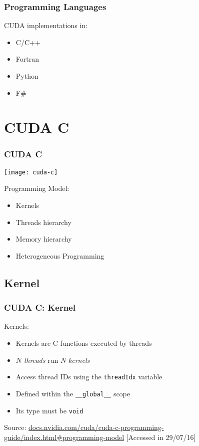 \documentclass[10pt, compress]{beamer}
\begin{document}
\begin{frame}
    \frametitle{Programming Languages}
    CUDA implementations in:
    \begin{itemize}
        \item \alert{C/C++}
        \item Fortran
        \item Python
        \item F\#
    \end{itemize}
\end{frame}

\section{CUDA C}

\begin{frame}
    \frametitle{CUDA C}
    \begin{center}
        \texttt{[image: cuda-c]}
    \end{center}

    \pause
    Programming Model:
    \pause
    \begin{itemize}
        \item \alert{Kernels}
            \pause
        \item \alert{Threads} hierarchy
            \pause
        \item \alert{Memory} hierarchy
            \pause
        \item \alert{Heterogeneous} Programming
    \end{itemize}
\end{frame}

\subsection{Kernel}

\begin{frame}
    \frametitle{CUDA C: Kernel}
    \alert{Kernels}:
    \begin{itemize}
        \item \alert{Kernels} are C functions executed by \alert{threads}
        \item $N$ \textit{threads} run $N$ \textit{kernels}
            \pause
        \item Access thread \alert{ID}s using the \alert{\texttt{threadIdx}} variable
            \pause
        \item Defined within the \alert{\texttt{\_\_global\_\_}} scope
        \item Its type must be \alert{\texttt{void}}
    \end{itemize}

    \vfill

    \begin{center}
        \tiny{Source: \url{docs.nvidia.com/cuda/cuda-c-programming-guide/index.html\#programming-model} [Accessed in 29/07/16]}
    \end{center}
\end{frame}
\end{document}
